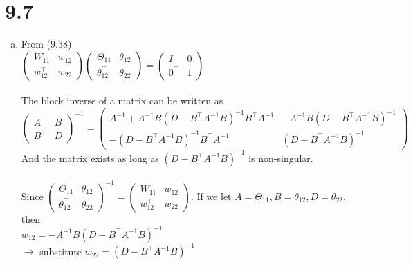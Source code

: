 \documentclass[11pt]{article}
\begin{document}
\newpage

\section*{9.7}

\begin{enumerate}[a)]

\item
From (9.38)\\
$\begin{pmatrix} W_{11} & w_{12} \\ w_{12}^\top & w_{22} \end{pmatrix} \begin{pmatrix} \Theta_{11} & \theta_{12} \\ \theta_{12}^\top & \theta_{22} \end{pmatrix} = \begin{pmatrix} I & 0 \\ 0^\top & 1 \end{pmatrix}$\\
\\
The block inverse of a matrix can be written as\\
$\begin{pmatrix} A & B \\ B^\top & D \end{pmatrix}^{-1} = \begin{pmatrix} A^{-1} + A^{-1} B (D - B^\top A^{-1} B)^{-1} B^\top A^{-1} & -A^{-1} B (D - B^\top A^{-1} B)^{-1} \\ - (D - B^\top A^{-1} B)^{-1} B^\top A^{-1} & (D - B^\top A^{-1} B)^{-1} \end{pmatrix}$\\
And the matrix exists as long as $(D - B^\top A^{-1} B)^{-1}$ is non-singular.\\
\\
Since $\begin{pmatrix} \Theta_{11} & \theta_{12} \\ \theta_{12}^\top & \theta_{22} \end{pmatrix}^{-1} = \begin{pmatrix} W_{11} & w_{12} \\ w_{12}^\top & w_{22} \end{pmatrix}$. If we let $A = \Theta_{11}, B = \theta_{12}, D = \theta_{22}$, then\\
$w_{12} = -A^{-1} B (D - B^\top A^{-1} B)^{-1}$\\
$\rightarrow$ substitute $w_{22} = (D - B^\top A^{-1} B)^{-1}$\\

\end{enumerate}
\end{document}
